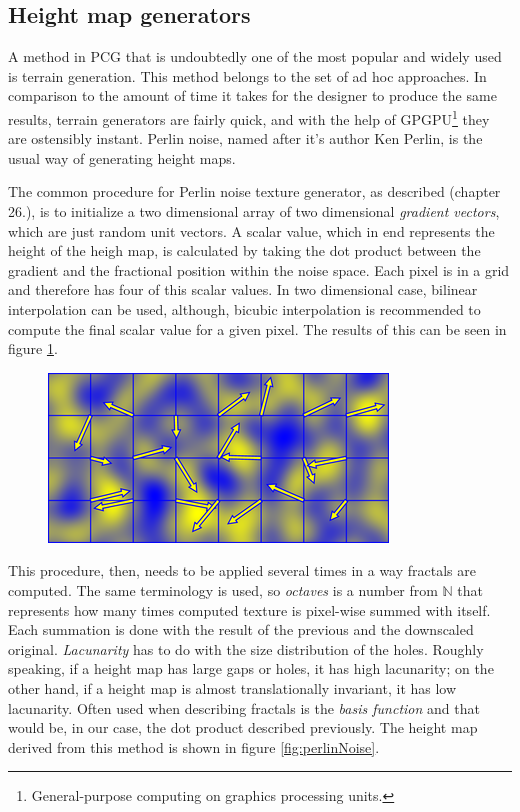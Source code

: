 \documentclass[journal]{IEEEtran}
\begin{document}
\subsection{Height map generators}\label{subsecHeightmap}
A method in PCG that is undoubtedly one of the most popular and widely used is terrain generation. This method belongs to the set of ad hoc approaches. In comparison to the amount of time it takes for the designer to produce the same results, terrain generators are fairly quick, and with the help of GPGPU\footnote{General-purpose computing on graphics processing units.} they are ostensibly instant. Perlin noise, named after it's author Ken Perlin, is the usual way of generating height maps.\par
The common procedure for Perlin noise texture generator, as described \cite{gpugems2} (chapter 26.), is to initialize a two dimensional array of two dimensional \textit{gradient vectors}, which are just random unit vectors. A scalar value, which in end represents the height of the heigh map, is calculated by taking the dot product between the gradient and the fractional position within the noise space. Each pixel is in a grid and therefore has four of this scalar values. In two dimensional case, bilinear interpolation can be used, although, bicubic interpolation is recommended to compute the final scalar value for a given pixel. The results of this can be seen in figure \ref{fig:gradientvectors}.\par
\begin{figure}[H]
	\centering
	\includegraphics[width=.8\linewidth]{gradientField.png}
	\label{fig:gradientvectors}
\end{figure}
This procedure, then, needs to be applied several times in a way fractals are computed. The same terminology is used, so \textit{octaves} is a number from $\mathbb{N}$ that represents how many times computed texture is pixel-wise summed with itself. Each summation is done with the result of the previous and the downscaled original. \textit{Lacunarity} has to do with the size distribution of the holes. Roughly speaking, if a height map has large gaps or holes, it has high lacunarity; on the other hand, if a height map is almost translationally invariant, it has low lacunarity. Often used when describing fractals is the \textit{basis function} and that would be, in our case, the dot product described previously. The height map derived from this method is shown in figure \ref{fig:perlinNoise}.\par
\end{document}
